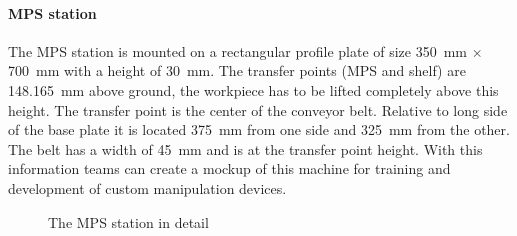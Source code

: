 \documentclass[12pt,twoside]{article}
\begin{document}
\paragraph{MPS station}
The MPS station is mounted on a rectangular profile plate of size
\SI{350}{\milli\metre} $\times$ \SI{700}{\milli\metre} with a height
of \SI{30}{\milli\metre}. The transfer points (MPS and shelf) are
\SI{148.165}{\milli\metre} above ground, the workpiece has to be
lifted completely above this height. The transfer point is the center
of the conveyor belt. Relative to long side of the base plate it is
located \SI{375}{\milli\metre} from one side and
\SI{325}{\milli\metre} from the other. The belt has a width of
\SI{45}{\milli\metre} and is at the transfer point height. With this
information teams can create a mockup of this machine for training and
development of custom manipulation devices.

\begin{figure}[h]
\centering
{} 
\quad
{}
\caption{The MPS station in detail}
\label{fig:mps-station}
\end{figure}
\end{document}
